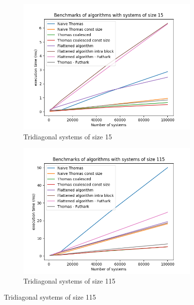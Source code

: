 \documentclass[a4paper,oneside]{memoir}
\begin{document}
\vspace*{\fill}

\begin{figure}[H]
    \begin{subfigure}[b]{0.6\textwidth}
        \centering
        \includegraphics[width=\textwidth]{timings_15.png}
        \caption{Tridiagonal systems of size 15}
        \label{fig:bench15}
    \end{subfigure}
    \begin{subfigure}[b]{0.6\textwidth}
        \centering
    \includegraphics[width=\textwidth]{timings_115.png}
    \caption{Tridiagonal systems of size 115}
    \label{fig:bench115}
        \end{subfigure}

\end{figure}
\end{document}
